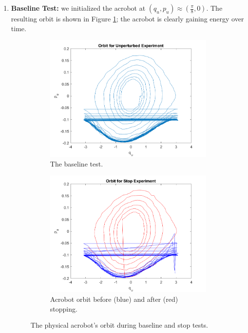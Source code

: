 \documentclass[journal,twoside,web]{ieeecolor}
\begin{document}
\begin{enumerate}
    \item \textbf{Baseline Test:} 
    we initialized the acrobot at 
    \((q_u,p_u) \approx \left(\frac{\pi}{8},0\right)\). 
    The resulting orbit is shown in Figure \ref{fig:acrobot-unperturbed-orbit};
    the acrobot is clearly gaining energy over time.

\begin{figure}
    \centering
    \begin{subfigure}[t]{0.45\linewidth}
        \includegraphics[width=\linewidth]{acrobot_unperturbed_orbit.png}
        \caption{The baseline test.}
        \label{fig:acrobot-unperturbed-orbit}
    \end{subfigure}
    \begin{subfigure}[t]{0.45\linewidth}
        \includegraphics[width=\linewidth]{acrobot_stopped_orbit.png}
        \caption{Acrobot orbit before (blue) and after (red) stopping.}
        \label{fig:acrobot-stopped-orbit}
    \end{subfigure}
    \caption{The physical acrobot's orbit during baseline and stop tests.}
\end{figure}


\end{enumerate}
\end{document}
